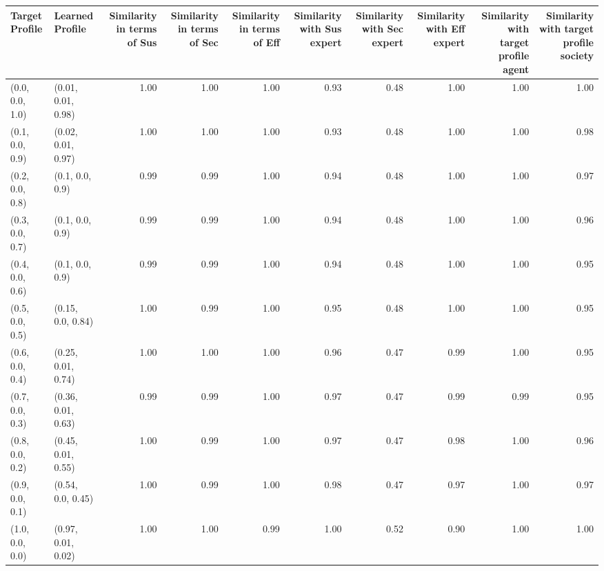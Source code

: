 \begin{tabular}{llrrrrrrrr}
\toprule
Target Profile & Learned Profile & Similarity in terms of Sus & Similarity in terms of Sec & Similarity in terms of Eff & Similarity with Sus expert & Similarity with Sec expert & Similarity with Eff expert & Similarity with target profile agent & Similarity with target profile society \\
\midrule
(0.0, 0.0, 1.0) & (0.01, 0.01, 0.98) & 1.00 & 1.00 & 1.00 & 0.93 & 0.48 & 1.00 & 1.00 & 1.00 \\
(0.1, 0.0, 0.9) & (0.02, 0.01, 0.97) & 1.00 & 1.00 & 1.00 & 0.93 & 0.48 & 1.00 & 1.00 & 0.98 \\
(0.2, 0.0, 0.8) & (0.1, 0.0, 0.9) & 0.99 & 0.99 & 1.00 & 0.94 & 0.48 & 1.00 & 1.00 & 0.97 \\
(0.3, 0.0, 0.7) & (0.1, 0.0, 0.9) & 0.99 & 0.99 & 1.00 & 0.94 & 0.48 & 1.00 & 1.00 & 0.96 \\
(0.4, 0.0, 0.6) & (0.1, 0.0, 0.9) & 0.99 & 0.99 & 1.00 & 0.94 & 0.48 & 1.00 & 1.00 & 0.95 \\
(0.5, 0.0, 0.5) & (0.15, 0.0, 0.84) & 1.00 & 0.99 & 1.00 & 0.95 & 0.48 & 1.00 & 1.00 & 0.95 \\
(0.6, 0.0, 0.4) & (0.25, 0.01, 0.74) & 1.00 & 1.00 & 1.00 & 0.96 & 0.47 & 0.99 & 1.00 & 0.95 \\
(0.7, 0.0, 0.3) & (0.36, 0.01, 0.63) & 0.99 & 0.99 & 1.00 & 0.97 & 0.47 & 0.99 & 0.99 & 0.95 \\
(0.8, 0.0, 0.2) & (0.45, 0.01, 0.55) & 1.00 & 0.99 & 1.00 & 0.97 & 0.47 & 0.98 & 1.00 & 0.96 \\
(0.9, 0.0, 0.1) & (0.54, 0.0, 0.45) & 1.00 & 0.99 & 1.00 & 0.98 & 0.47 & 0.97 & 1.00 & 0.97 \\
(1.0, 0.0, 0.0) & (0.97, 0.01, 0.02) & 1.00 & 1.00 & 0.99 & 1.00 & 0.52 & 0.90 & 1.00 & 1.00 \\
\bottomrule
\end{tabular}
